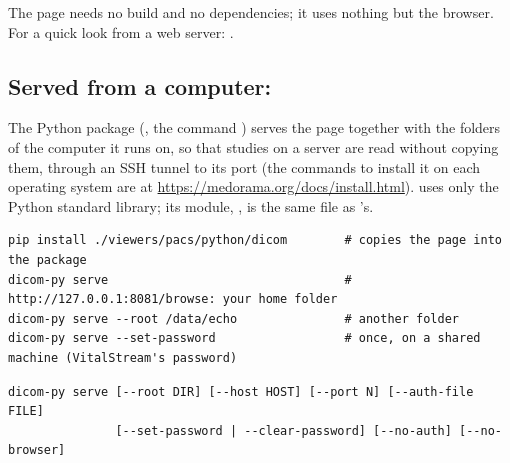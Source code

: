 The page needs no build and no dependencies; it uses nothing but the browser. For a quick look
from a web server: .

\subsection{Served from a computer: \texorpdfstring{}{dicom-py serve}}
\label{sec:pacs-viewer-serve}

The Python package  (, the command
) serves the page together with the folders of the computer it runs on, so that
studies on a server are read without copying them, through an SSH tunnel to its port (the
commands to install it on each operating system are at \url{https://medorama.org/docs/install.html}). 
uses only the Python standard library; its module, , is the same file as
's.

\begin{lstlisting}[style=shell]
pip install ./viewers/pacs/python/dicom        # copies the page into the package
dicom-py serve                                 # http://127.0.0.1:8081/browse: your home folder
dicom-py serve --root /data/echo               # another folder
dicom-py serve --set-password                  # once, on a shared machine (VitalStream's password)
\end{lstlisting}

\begin{lstlisting}[style=signature]
dicom-py serve [--root DIR] [--host HOST] [--port N] [--auth-file FILE]
               [--set-password | --clear-password] [--no-auth] [--no-browser]
\end{lstlisting}

